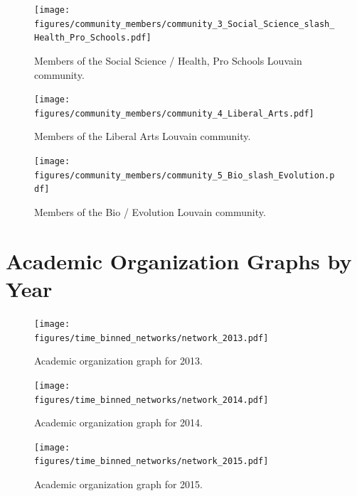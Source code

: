 \documentclass[notitlepage,aps,prd,nofootinbib]{revtex4-1}
\newcommand{\figures}{../outputs/plots}
\begin{document}
\begin{figure}[!htb]\centering
  \texttt{[image: \\figures/community\_members/community\_3\_Social\_Science\_slash\_Health\_Pro\_Schools.pdf]}
  \caption{Members of the Social Science / Health, Pro Schools Louvain community.}
\end{figure}

\begin{figure}[!htb]\centering
  \texttt{[image: \\figures/community\_members/community\_4\_Liberal\_Arts.pdf]}
  \caption{Members of the Liberal Arts Louvain community.}
\end{figure}

\begin{figure}[!htb]\centering
  \texttt{[image: \\figures/community\_members/community\_5\_Bio\_slash\_Evolution.pdf]}
  \caption{Members of the Bio / Evolution Louvain community.}
\end{figure}


\appendix*
\section{Academic Organization Graphs by Year}

\begin{figure}[!htb]\centering
  \texttt{[image: \\figures/time\_binned\_networks/network\_2013.pdf]}
  \caption{Academic organization graph for 2013.}
\end{figure}

\begin{figure}[!htb]\centering
  \texttt{[image: \\figures/time\_binned\_networks/network\_2014.pdf]}
  \caption{Academic organization graph for 2014.}
\end{figure}

\begin{figure}[!htb]\centering
  \texttt{[image: \\figures/time\_binned\_networks/network\_2015.pdf]}
  \caption{Academic organization graph for 2015.}
\end{figure}
\end{document}
